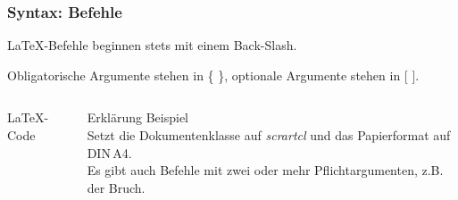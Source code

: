 \begin{frame}[fragile]
    \frametitle{Syntax: Befehle}
    \LaTeX-Befehle beginnen stets mit einem Back-Slash.

    Obligatorische Argumente stehen in \{ \}, optionale Argumente stehen in [ ].
    \begin{columns}[T]
        \begin{column}{0.47\textwidth}
            \begin{block}{\LaTeX-Code}
            \end{block}
        \end{column}
        \begin{column}{0.47\textwidth}
            \begin{block}{Erklärung}
                Beispiel \\
                Setzt die Dokumentenklasse auf \emph{scrartcl} und das Papierformat auf DIN\,A4. \\
                Es gibt auch Befehle mit zwei oder mehr Pflichtargumenten, z.B. der Bruch.
            \end{block}
        \end{column}
    \end{columns}
\end{frame}

